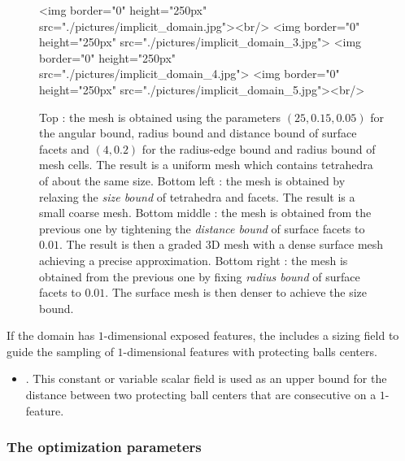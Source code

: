 \begin{figure}[ht]
\begin{center}
\begin{ccHtmlOnly}
   <img border="0" height="250px" src="./pictures/implicit_domain.jpg"><br/>
   <img border="0" height="250px" src="./pictures/implicit_domain_3.jpg">
   <img border="0" height="250px" src="./pictures/implicit_domain_4.jpg">
   <img border="0" height="250px" src="./pictures/implicit_domain_5.jpg"><br/>
 \end{ccHtmlOnly}
 \caption{Top : the mesh  is obtained using the parameters $(25,0.15,0.05)$ for the angular bound,
radius bound and distance bound of  surface facets
and 
$(4,0.2)$ for  the radius-edge bound and radius  bound of mesh cells. The result is a  uniform mesh which contains tetrahedra
of about the same size. 
Bottom  left :
the mesh  is obtained by relaxing the \emph{ size bound} of tetrahedra
and facets.
 The result is a small coarse mesh. 
Bottom middle : the mesh  is obtained from the previous one  by tightening the \emph{distance bound} 
of surface facets to
$0.01$. The result is then a graded 3D mesh with a dense surface mesh
achieving a precise approximation. 
Bottom right :
the mesh  is obtained from the previous one  by fixing \emph{radius bound} of surface facets to $0.01$. The surface mesh is then denser to achieve the size bound.}
  \label{figure:parameters}
\end{center}
\end{figure}


If the domain has $1$-dimensional exposed features, the  includes
a sizing field to guide 
the sampling of $1$-dimensional features with  protecting balls centers.
\begin{itemize}
\item \emph{}. This  constant or variable scalar field is used as an upper bound for the distance between two 
protecting ball centers  that are consecutive on a $1$-feature.
\end{itemize}

\subsubsection{The optimization parameters}

